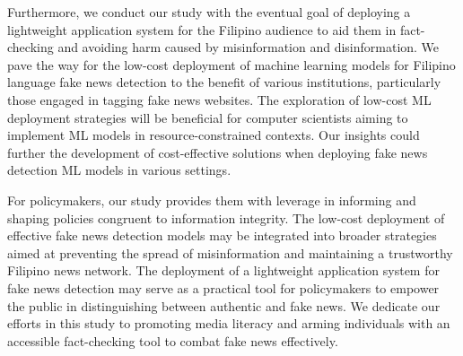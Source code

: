 Furthermore, we conduct our study with the eventual goal of deploying a lightweight application system for the Filipino audience to aid them in fact-checking and avoiding harm caused by misinformation and disinformation. We pave the way for the low-cost deployment of machine learning models for Filipino language fake news detection to the benefit of various institutions, particularly those engaged in tagging fake news websites. The exploration of low-cost ML deployment strategies will be beneficial for computer scientists aiming to implement ML models in resource-constrained contexts. Our insights could further the development of cost-effective solutions when deploying fake news detection ML models in various settings.

For policymakers, our study provides them with leverage in informing and shaping policies congruent to information integrity. The low-cost deployment of effective fake news detection models may be integrated into broader strategies aimed at preventing the spread of misinformation and maintaining a trustworthy Filipino news network. The deployment of a lightweight application system for fake news detection may serve as a practical tool for policymakers to empower the public in distinguishing between authentic and fake news. We dedicate our efforts in this study to promoting media literacy and arming individuals with an accessible fact-checking tool to combat fake news effectively.